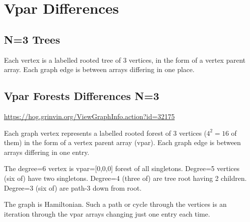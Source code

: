\documentclass{article}
\begin{document}
\section{Vpar Differences}

\subsection{N=3 Trees}

Each vertex is a labelled rooted tree of 3 vertices, in the form of a
vertex parent array.  Each graph edge is between arrays differing in
one place.

\begin{center}
\end{center}

\subsection{Vpar Forests Differences N=3}

\url{https://hog.grinvin.org/ViewGraphInfo.action?id=32175}

Each graph vertex represents a labelled rooted forest of 3 vertices
($4^2 {=} 16$ of them) in the form of a vertex parent array (vpar).
Each graph edge is between arrays differing in one entry.

The degree=6 vertex is vpar=[0,0,0] forest of all singletons.
Degree=5 vertices (six of) have two singletons.  Degree=4 (three of)
are tree root having 2 children.  Degree=3 (six of) are path-3 down
from root.

The graph is Hamiltonian.  Such a path or cycle through the vertices
is an iteration through the vpar arrays changing just one entry each
time.
\end{document}
